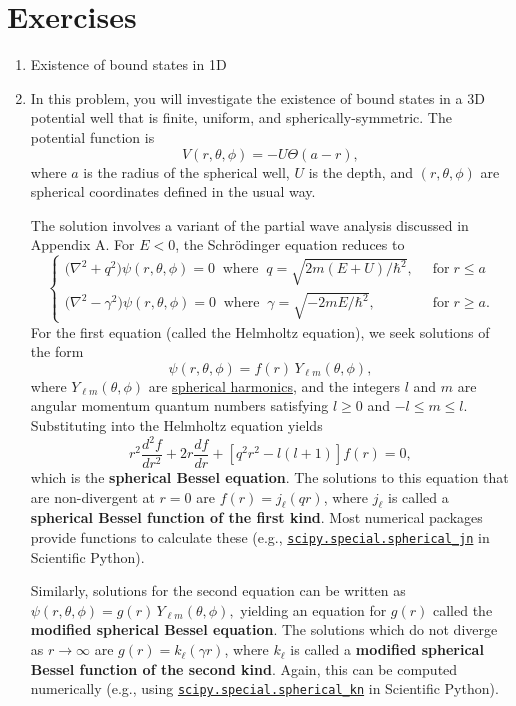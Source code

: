\documentclass[pra,12pt]{revtex4}
\begin{document}
\section*{Exercises}

\begin{enumerate}
\item Existence of bound states in 1D
\label{ex:boundstate}

\item In this problem, you will investigate the existence of bound
  states in a 3D potential well that is finite, uniform, and
  spherically-symmetric.  The potential function is
$$V(r,\theta,\phi) = -U\Theta(a-r),$$
  where $a$ is the radius of the spherical well, $U$ is the depth,
  and $(r,\theta,\phi)$ are spherical coordinates defined in the usual
  way.

  The solution involves a variant of the partial wave analysis
  discussed in Appendix A.  For $E < 0$, the Schr\"odinger equation
  reduces to
$$\begin{cases}\Big(\nabla^2 + q^2\Big) \psi(r,\theta,\phi) = 0 \;\;\mathrm{where}\;\; q = \sqrt{2m(E+U)/\hbar^2}, \;\;&\mathrm{for} \; r \le a \\ \Big(\nabla^2 - \gamma^2\Big) \psi(r,\theta,\phi) = 0 \;\;\mathrm{where}\;\; \gamma = \sqrt{-2mE/\hbar^2}, \;\;&\mathrm{for} \; r \ge a. \end{cases}$$
  For the first equation (called the Helmholtz equation), we seek
  solutions of the form
  $$\psi(r,\theta,\phi) = f(r) \, Y_{\ell m}(\theta,\phi),$$
  where $Y_{\ell m}(\theta,\phi)$ are
  \href{https://en.wikipedia.org/wiki/Spherical_harmonics}{spherical
    harmonics}, and the integers $l$ and $m$ are angular momentum
  quantum numbers satisfying $l \ge 0$ and $-l \le m \le l$.
  Substituting into the Helmholtz equation yields
  $$r^2\frac{d^2f}{dr^2} + 2r \frac{df}{dr}+\left[q^2r^2-l(l+1)\right] f(r) = 0,$$
  which is the \textbf{spherical Bessel equation}.  The solutions to
  this equation that are non-divergent at $r = 0$ are $f(r) =
  j_\ell(qr)$, where $j_\ell$ is called a \textbf{spherical Bessel function
    of the first kind}.  Most numerical packages provide functions to
  calculate these (e.g.,
  \href{https://docs.scipy.org/doc/scipy/reference/generated/scipy.special.spherical_jn.html}{\texttt{scipy.special.spherical\_jn}}
  in Scientific Python).

  Similarly, solutions for the second equation can be written as
  $\psi(r,\theta,\phi) = g(r) \, Y_{\ell m}(\theta,\phi),$ yielding an
  equation for $g(r)$ called the \textbf{modified spherical Bessel
    equation}.  The solutions which do not diverge as $r\rightarrow
  \infty$ are $g(r) = k_\ell(\gamma r)$, where $k_\ell$ is called a
  \textbf{modified spherical Bessel function of the second kind}.
  Again, this can be computed numerically (e.g., using
  \href{https://docs.scipy.org/doc/scipy/reference/generated/scipy.special.spherical_kn.html#scipy.special.spherical_kn}{\texttt{scipy.special.spherical\_kn}}
  in Scientific Python).


\end{enumerate}
\end{document}

